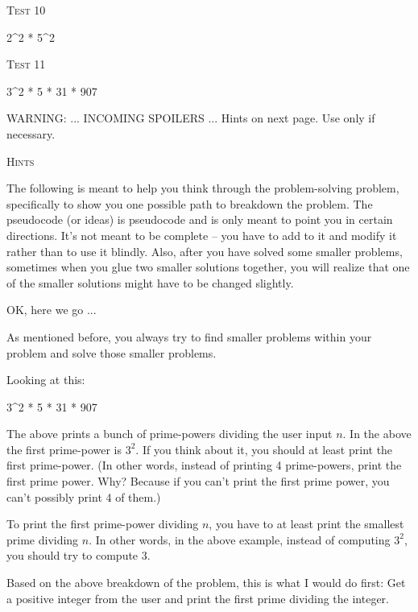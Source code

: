 \textsc{Test 10}
\begin{console}[commandchars=\\\{\}]
2^2 * 5^2
\end{console}

\textsc{Test 11}
\begin{console}[commandchars=\\\{\}]
3^2 * 5 * 31 * 907
\end{console}

WARNING: ... INCOMING SPOILERS ... Hints on next page. Use only if necessary.

\newpage
\textsc{Hints}


The following is meant to help you think through the problem-solving problem,
specifically to show you one possible path to breakdown the problem.
The pseudocode (or ideas) is pseudocode and is only meant to point you in certain directions.
It's not meant to be complete -- you have to add to it and modify it rather than to
use it blindly.
Also, after you have solved some smaller problems, sometimes when you glue two smaller
solutions together, you will realize that one of the smaller solutions might have to
be changed slightly.

OK, here we go ...

As mentioned before, you always try to find smaller problems
within your problem and solve those smaller problems.

Looking at this:
\begin{console}[commandchars=\\\{\}]
3^2 * 5 * 31 * 907
\end{console}

The above prints a bunch of prime-powers dividing the user input $n$.
In the above the first prime-power is $3^2$.
If you think about it, you should at least print the first prime-power.
(In other words, instead of printing 4 prime-powers, print the first
prime power. Why? Because if you can't print the first prime power,
you can't possibly print 4 of them.)

To print the first prime-power dividing $n$, you have to at least
print the smallest prime dividing $n$.
In other words, in the above example,
instead of computing $3^2$, you should try to compute $3$.

Based on the above breakdown of the problem, this is what I would do first:
Get a positive integer from the user and print the first
prime dividing the integer.


